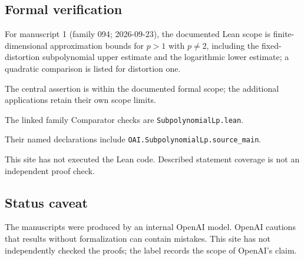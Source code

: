 \documentclass[11pt]{article}
\begin{document}
\subsection{Formal verification}
For manuscript 1 (family 094; 2026-09-23), the documented Lean scope is finite-dimensional approximation bounds for $p>1$ with $p\ne2$, including the fixed-distortion subpolynomial upper estimate and the logarithmic lower estimate; a quadratic comparison is listed for distortion one.

The central assertion is within the documented formal scope; the additional applications retain their own scope limits.

The linked family Comparator checks are \texttt{SubpolynomialLp.lean}.

Their named declarations include \texttt{OAI.SubpolynomialLp.source\_main}.

This site has not executed the Lean code. Described statement coverage is not an independent proof check.

\subsection{Status caveat}
The manuscripts were produced by an internal OpenAI model. OpenAI cautions that results without formalization can contain mistakes. This site has not independently checked the proofs; the label records the scope of OpenAI's claim.
\end{document}
